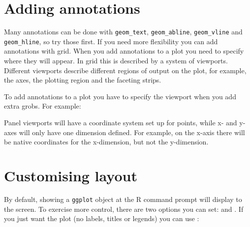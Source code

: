 % 


\section{Adding annotations}\label{sec:adding_annotation}
\label{sec:grid-new}

Many annotations can be done with {\tt geom\_text}, {\tt geom\_abline}, {\tt geom\_vline} and {\tt geom\_hline}, so try those first.  If you need more flexibility you can add annotations with grid.  When you add annotations to a plot you need to specify where they will appear.  In grid this is described by a system of viewports.  Different viewports describe different regions of output on the plot, for example, the axes, the plotting region and the faceting strips.

To add annotations to a plot you have to specify the viewport when you add extra grobs.  For example:

% 


Panel viewports will have a coordinate system set up for points, while x- and y- axes will only have one dimension defined.  For example, on the x-axis there will be native coordinates for the x-dimension, but not the y-dimension.

% 


\section{Customising layout}
\label{sec:grid-layout}

By default, showing a {\tt ggplot} object at the R command prompt will display to the screen.  To exercise more control, there are two options you can set:  and .  If you just want the plot (no labels, titles or legends) you can use :

% 


